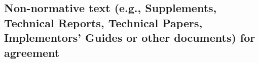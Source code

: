 
\subsection{Non-normative text (e.g., Supplements, Technical Reports, Technical Papers, Implementors' Guides or other documents) for agreement}\label{non-normative-text}
